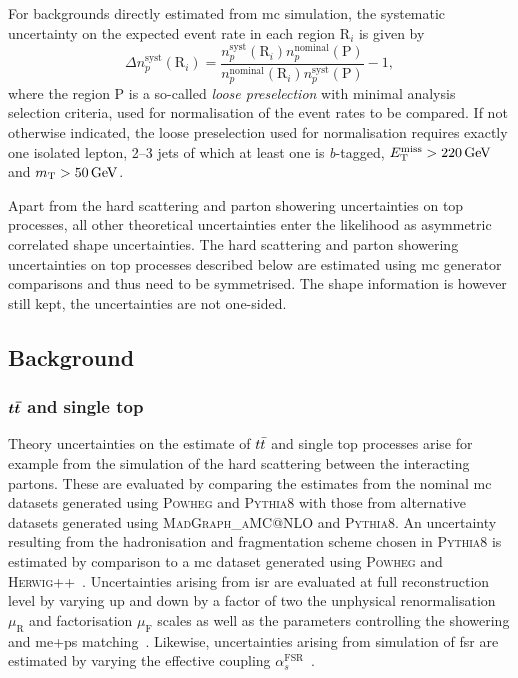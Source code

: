  For backgrounds directly estimated from \gls{mc} simulation, the systematic uncertainty on the expected event rate in each region R$_i$ is given by
 \begin{equation}
 	\Delta n_p^\mathrm{syst}(\mathrm{R}_i) = \frac{n_p^\mathrm{syst}(\mathrm{R}_i)n_p^\mathrm{nominal}(\mathrm{P})}{n_p^\mathrm{nominal}(\mathrm{R}_i)n_p^\mathrm{syst}(\mathrm{P})} - 1,
 \end{equation}
 where the region P is a so-called \textit{loose preselection} with minimal analysis selection criteria, used for normalisation of the event rates to be compared. If not otherwise indicated, the loose preselection used for normalisation requires exactly one isolated lepton, 2--3 jets of which at least one is \textit{b}-tagged, $\etmiss>\SI{220}{\GeV}$ and $\mt>\SI{50}{\GeV}$.
 
 Apart from the hard scattering and parton showering uncertainties on top processes, all other theoretical uncertainties enter the likelihood as asymmetric correlated shape uncertainties. The hard scattering and parton showering uncertainties on top processes described below are estimated using \gls{mc} generator comparisons and thus need to be symmetrised. The shape information is however still kept, \ie the uncertainties are not one-sided.
 
 \subsection{Background}
 
 \subsubsection{$\boldsymbol{t\bar{t}}$ and single top}
 
 Theory uncertainties on the estimate of $t\bar{t}$ and single top processes arise for example from the simulation of the hard scattering between the interacting partons. These are evaluated by comparing the estimates from the nominal \gls{mc} datasets generated using \textsc{Powheg} and \textsc{Pythia8} with those from alternative datasets generated using \textsc{MadGraph\_aMC@NLO} and \textsc{Pythia8}. An uncertainty resulting from the hadronisation and fragmentation scheme chosen in \textsc{Pythia8} is estimated by comparison to a \gls{mc} dataset generated using \textsc{Powheg} and \textsc{Herwig++}~\cite{Herwig:2015jjp}. Uncertainties arising from \gls{isr} are evaluated at full reconstruction level by varying up and down by a factor of two the unphysical renormalisation $\mu_\mathrm{R}$ and factorisation $\mu_\mathrm{F}$ scales as well as the parameters controlling the showering and \gls{me}+\gls{ps} matching~\cite{ATL-PHYS-PUB-2016-004}. Likewise, uncertainties arising from simulation of \gls{fsr} are estimated by varying the effective coupling $\alpha_s^{\mathrm{FSR}}$~\cite{ATL-PHYS-PUB-2016-004}. 
 
